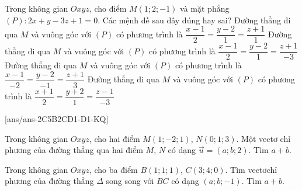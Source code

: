 \begin{ex}%
Trong không gian $Oxyz$, cho điểm $M(1;2;-1)$ và mặt phẳng $(P)\colon 2x+y-3z+1=0$. Các mệnh đề sau đây đúng hay sai?
\choiceTF
{ Đường thẳng đi qua $M$ và vuông góc với $(P)$ có phương trình là $\dfrac{x-1}{2}=\dfrac{y-2}{1}=\dfrac{z+1}{1}$}
{\True  Đường thẳng đi qua $M$ và vuông góc với $(P)$ có phương trình là $\dfrac{x-1}{2}=\dfrac{y-2}{1}=\dfrac{z+1}{-3}$}
{\True  Đường thẳng đi qua $M$ và vuông góc với ${(P)}$ có phương trình là $\dfrac{x-1}{-2}=\dfrac{y-2}{-1}=\dfrac{z+1}{3}$}
{Đường thẳng đi qua $M$ và vuông góc với $(P)$ có phương trình là $\dfrac{x+1}{2}=\dfrac{y+2}{1}=\dfrac{z-1}{-3}$}
\end{ex}


[ans/ans-2C5B2CD1-D1-KQ]
\TNSA
\begin{ex}%
Trong không gian $Oxyz$, cho hai điểm $M\left( 1;-2;1 \right)$, $N\left( 0;1;3 \right)$. Một vectơ chỉ phương của đường thẳng qua hai điểm $M$, $N$ có dạng $\overrightarrow{u}=(a;b;2)$. Tìm $a+b.$
\end{ex}
\begin{ex}%
	Trong không gian $Oxyz$, cho ba điểm $B\left( 1;1;1 \right)$, $C\left( 3;4;0 \right)$. Tìm vectơchỉ phương của đường thẳng $\Delta $ song song với $BC$ có dạng $(a;b;-1)$. Tìm $a+b$.
\end{ex}

